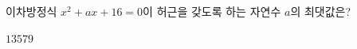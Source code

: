 이차방정식 $x^2+ax+16=0$이 허근을 갖도록 하는 자연수 $a$의 최댓값은?
\begin{choices32}{$1$}{$3$}{$5$}{$7$}{$9$}\end{choices32}
